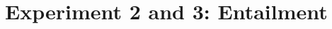 \documentclass[11pt,fleqn]{article}
\newcommand{\6}{\mbox{$[\hspace*{-.6mm}[$}}
\newcommand{\9}{\mbox{$]\hspace*{-.6mm}]$}}
\begin{document}








 
\section{Experiment 2 and 3: Entailment}\label{s3}
\end{document}
